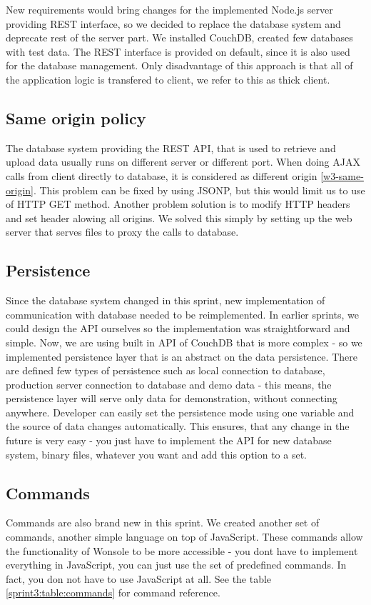 New requirements would bring changes for the implemented Node.js server providing REST interface, so we decided to replace the database system and deprecate rest of the server part. We installed CouchDB, created few databases with test data. The REST interface is provided on default, since it is also used for the database management. Only disadvantage of this approach is that all of the application logic is transfered to client, we refer to this as thick client.


\subsection{Same origin policy}
The database system providing the REST API, that is used to retrieve and upload
data usually runs on different server or different port. When doing AJAX
calls from client directly to database, it is considered as different origin
\ref{w3-same-origin}.
This problem can be fixed by using JSONP, but this would limit us to use of HTTP
GET method. Another problem solution is to modify HTTP headers and set header
alowing all origins. We solved this simply by setting up the web server that
serves files to proxy the calls to database.


\subsection{Persistence}
Since the database system changed in this sprint, new implementation of
communication with database needed to be reimplemented. In earlier sprints, we
could design the API ourselves so the implementation was straightforward and
simple. Now, we are using built in API of CouchDB that is more complex - so we
implemented persistence layer that is an abstract on the data persistence. There
are defined few types of persistence such as local connection to database,
production server connection to database and demo data - this means, the
persistence layer will serve only data for demonstration, without connecting
anywhere. Developer can easily set the persistence mode using one variable and
the source of data changes automatically. This ensures, that any change in the
future is very easy - you just have to implement the API for new database
system, binary files, whatever you want and add this option to a set.

\subsection{Commands}
Commands are also brand new in this sprint. We created another set of commands,
another simple language on top of JavaScript. These commands allow the
functionality of Wonsole to be more accessible - you dont have to implement
everything in JavaScript, you can just use the set of predefined commands. In
fact, you don not have to use JavaScript at all. See the table
\ref{sprint3:table:commands} for command reference.


